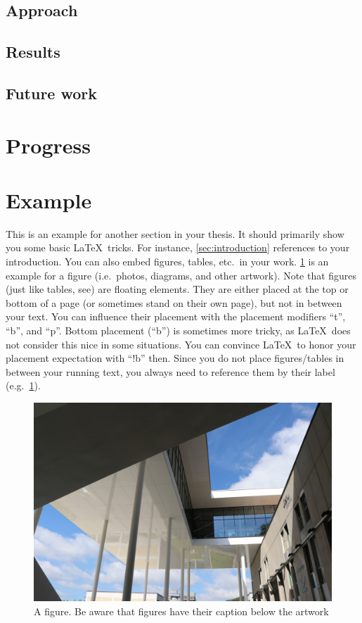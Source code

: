 \documentclass[a4paper,oneside,10pt,ngerman,english]{scrartcl}
\begin{document}
\subsection{Approach}
\subsection{Results}
\subsection{Future work} 


\section{Progress}
\label{sec:progress}




\section{Example}
\label{sec:example}

This is an example for another section in your thesis.
It should primarily show you some basic \LaTeX\ tricks.
For instance, \ref{sec:introduction} references to your introduction.
You can also embed figures, tables, etc.\ in your work.
\ref{fig:learningcenter} is an example for a figure (i.e.\ photos, diagrams, and other artwork).
Note that figures (just like tables, see) are floating elements.
They are either placed at the top or bottom of a page (or sometimes stand on their own page), but not in between your text.
You can influence their placement with the placement modifiers ``t'', ``b'', and ``p''.
Bottom placement (``b'') is sometimes more tricky, as \LaTeX\ does not consider this nice in some situations.
You can convince \LaTeX\ to honor your placement expectation with ``!b'' then.
Since you do not place figures/tables in between your running text, you always need to reference them by their label (e.g.\ \ref{fig:learningcenter}).
\begin{figure}[!b]
\centering
\includegraphics[width=\linewidth]{images/jku_learningcenter}
\caption{
    A figure. Be aware that figures have their caption below the artwork
}\label{fig:learningcenter}
\end{figure}
\end{document}
